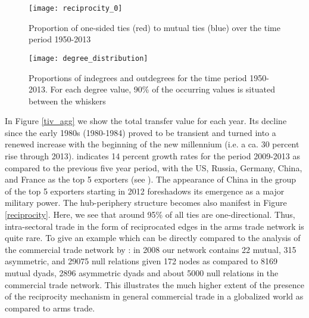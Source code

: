 \documentclass[12pt, letterpaper]{article}
\numberwithin{equation}{section}
\begin{document}





\begin{figure}
\begin{center}
\texttt{[image: reciprocity\_0]}
\caption{Proportion of one-sided ties (red) to mutual ties (blue) over the time period 1950-2013 }
\label{reciprocity}
\texttt{[image: degree\_distribution]}
\caption{Proportions of indegrees and outdegrees for the time period 1950-2013. For each degree value, 90\% of the occurring values is situated between the whiskers  }
\label{deg_dist}
\end{center}
\end{figure} 

In Figure \ref{tiv_agg} we show the total transfer value for each year. Its decline since the early 1980s (1980-1984) proved to be transient and turned into a renewed increase with the beginning of the new millennium (i.e. a ca. 30 percent rise through 2013). \citet[241]{SIPRI:14} indicates 14 percent growth rates for the period 2009-2013 as compared to the previous five year period, with the US, Russia, Germany, China, and France as the top 5 exporters (see \citet[258]{SIPRI:14}). The appearance of China in the group of the top 5 exporters starting in 2012 foreshadows its emergence as a major military power. 
The hub-periphery structure becomes also manifest in Figure \ref{reciprocity}. Here, we see that around 95\% of all ties are one-directional. Thus, intra-sectoral trade in the form of reciprocated edges in the arms trade network is quite rare. 
To give an example which can be directly compared to the analysis of the commercial trade network by \cite{WaAhAr:13}: in 2008 our network contains 22 mutual, 315 asymmetric, and 29075 null relations given 172 nodes as compared to 8169 mutual dyads, 2896 asymmetric dyads and about 5000 null relations in the commercial trade network. This illustrates the much higher extent of the presence of the reciprocity mechanism in general commercial trade in a globalized world as compared to arms trade.
\end{document}
